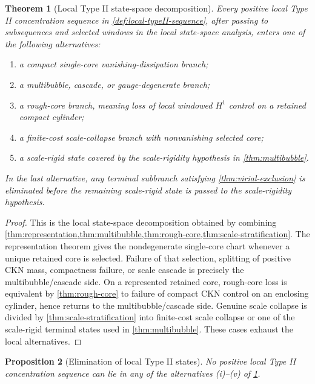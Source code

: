 \documentclass[11pt]{amsart}
\theoremstyle{plain}
\newtheorem{theorem}{Theorem}[section]
\newtheorem{proposition}[theorem]{Proposition}
\theoremstyle{definition}
\theoremstyle{remark}
\begin{document}
\begin{theorem}[Local Type II state-space decomposition]
\label{thm:state-decomposition}
Every positive local Type II concentration sequence in
\cref{def:local-typeII-sequence}, after passing to subsequences and selected
windows in the local state-space analysis, enters one of the following
alternatives:
\begin{enumerate}[label=\textup{(\roman*)}]
\item a compact single-core vanishing-dissipation branch;
\item a multibubble, cascade, or gauge-degenerate branch;
\item a rough-core branch, meaning loss of local windowed \(H^1\) control on a
retained compact cylinder;
\item a finite-cost scale-collapse branch with nonvanishing selected core;
\item a scale-rigid state covered by the scale-rigidity hypothesis in
\cref{thm:multibubble}.
\end{enumerate}
In the last alternative, any terminal subbranch satisfying
\cref{thm:virial-exclusion} is eliminated before the remaining scale-rigid
state is passed to the scale-rigidity hypothesis.
\end{theorem}

\begin{proof}
This is the local state-space decomposition obtained by combining
\cref{thm:representation,thm:multibubble,thm:rough-core,thm:scale-stratification}.
The representation theorem gives the nondegenerate single-core chart whenever a
unique retained core is selected.  Failure of that selection, splitting of
positive CKN mass, compactness failure, or scale cascade is precisely the
multibubble/cascade side.  On a represented retained core, rough-core loss is
equivalent by \cref{thm:rough-core} to failure of compact CKN control on an
enclosing cylinder, hence returns to the multibubble/cascade side.  Genuine
scale collapse is divided by \cref{thm:scale-stratification} into finite-cost
scale collapse or one of the scale-rigid terminal states used in
\cref{thm:multibubble}.  These cases exhaust the local alternatives.
\end{proof}

\begin{proposition}[Elimination of local Type II states]
\label{prop:state-elimination}
No positive local Type II concentration sequence can lie in any of the
alternatives \textup{(i)}--\textup{(v)} of
\cref{thm:state-decomposition}.
\end{proposition}
\end{document}

